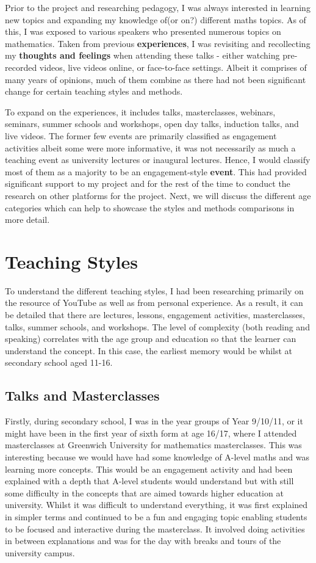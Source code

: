 \documentclass[12pt, a4paper,oneside]{book}
\numberwithin{equation}{section}
\begin{document}
Prior to the project and researching pedagogy, I was always interested in learning new topics and expanding my knowledge of(or on?) different maths topics. As of this, I was exposed to various speakers who presented numerous topics on mathematics. Taken from previous {\color{red}\textbf{experiences}}, I was revisiting and recollecting my {\color{red}\textbf{thoughts and feelings}} when attending these talks - either watching pre-recorded videos, live videos online, or face-to-face settings. Albeit it comprises of many years of opinions, much of them combine as there had not been significant change for certain teaching styles and methods.

To expand on the experiences, it includes talks, masterclasses, webinars, seminars, summer schools and workshops, open day talks, induction talks, and live videos. The former few events are primarily classified as engagement activities albeit some were more informative, it was not necessarily as much a teaching event as university lectures or inaugural lectures. Hence, I would classify most of them as a majority to be an engagement-style {\color{red}\textbf{event}}. This had provided significant support to my project and for the rest of the time to conduct the research on other platforms for the project. Next, we will discuss the different age categories which can help to showcase the styles and methods comparisons in more detail.

\section{Teaching Styles}\label{sec:2.1}
To understand the different teaching styles, I had been researching primarily on the resource of YouTube as well as from personal experience. As a result, it can be detailed that there are lectures, lessons, engagement activities, masterclasses, talks, summer schools, and workshops. The level of complexity (both reading and speaking) correlates with the age group and education so that the learner can understand the concept. In this case, the earliest memory would be whilst at secondary school aged 11-16.

\subsection{Talks and Masterclasses}
Firstly, during secondary school, I was in the year groups of Year 9/10/11, or it might have been in the first year of sixth form at age 16/17, where I attended masterclasses at Greenwich University for mathematics masterclasses. This was interesting because we would have had some knowledge of A-level maths and was learning more concepts. This would be an engagement activity and had been explained with a depth that A-level students would understand but with still some difficulty in the concepts that are aimed towards higher education at university. Whilst it was difficult to understand everything, it was first explained in simpler terms and continued to be a fun and engaging topic enabling students to be focused and interactive during the masterclass. It involved doing activities in between explanations and was for the day with breaks and tours of the university campus.
\end{document}
